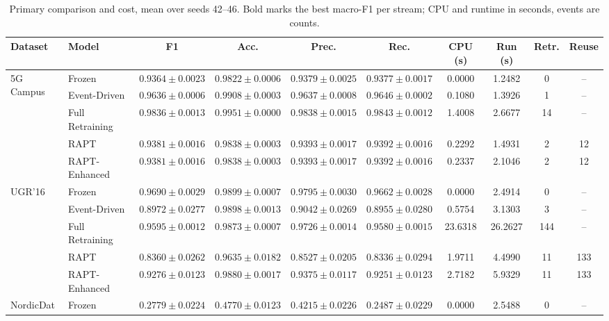 \documentclass[conference]{IEEEtran}
\begin{document}
\begin{table}[t]
\caption{Primary comparison and cost, mean over seeds 42--46. Bold marks the
best macro-F1 per stream; CPU and runtime in seconds, events are counts.}
\label{tab:primary}
\centering
\scriptsize
\begin{tabular}{@{}llcccccccc@{}}
\toprule
\textbf{Dataset} & \textbf{Model} & \textbf{F1} & \textbf{Acc.} & \textbf{Prec.} & \textbf{Rec.} & \textbf{CPU (s)} & \textbf{Run (s)} & \textbf{Retr.} & \textbf{Reuse} \\
\midrule
\multirow{5}{*}{5G Campus}
 & Frozen          & $0.9364 \pm 0.0023$ & $0.9822 \pm 0.0006$ & $0.9379 \pm 0.0025$ & $0.9377 \pm 0.0017$ & 0.0000 & 1.2482 & 0 & -- \\
 & Event-Driven    & $0.9636 \pm 0.0006$ & $0.9908 \pm 0.0003$ & $0.9637 \pm 0.0008$ & $0.9646 \pm 0.0002$ & 0.1080 & 1.3926 & 1 & -- \\
 & Full Retraining & $\mathbf{0.9836 \pm 0.0013}$ & $0.9951 \pm 0.0000$ & $0.9838 \pm 0.0015$ & $0.9843 \pm 0.0012$ & 1.4008 & 2.6677 & 14 & -- \\
 & RAPT            & $0.9381 \pm 0.0016$ & $0.9838 \pm 0.0003$ & $0.9393 \pm 0.0017$ & $0.9392 \pm 0.0016$ & 0.2292 & 1.4931 & 2 & 12 \\
 & RAPT-Enhanced   & $0.9381 \pm 0.0016$ & $0.9838 \pm 0.0003$ & $0.9393 \pm 0.0017$ & $0.9392 \pm 0.0016$ & 0.2337 & 2.1046 & 2 & 12 \\
\midrule
\multirow{5}{*}{UGR'16}
 & Frozen          & $\mathbf{0.9690 \pm 0.0029}$ & $0.9899 \pm 0.0007$ & $0.9795 \pm 0.0030$ & $0.9662 \pm 0.0028$ & 0.0000 & 2.4914 & 0 & -- \\
 & Event-Driven    & $0.8972 \pm 0.0277$ & $0.9898 \pm 0.0013$ & $0.9042 \pm 0.0269$ & $0.8955 \pm 0.0280$ & 0.5754 & 3.1303 & 3 & -- \\
 & Full Retraining & $0.9595 \pm 0.0012$ & $0.9873 \pm 0.0007$ & $0.9726 \pm 0.0014$ & $0.9580 \pm 0.0015$ & 23.6318 & 26.2627 & 144 & -- \\
 & RAPT            & $0.8360 \pm 0.0262$ & $0.9635 \pm 0.0182$ & $0.8527 \pm 0.0205$ & $0.8336 \pm 0.0294$ & 1.9711 & 4.4990 & 11 & 133 \\
 & RAPT-Enhanced   & $0.9276 \pm 0.0123$ & $0.9880 \pm 0.0017$ & $0.9375 \pm 0.0117$ & $0.9251 \pm 0.0123$ & 2.7182 & 5.9329 & 11 & 133 \\
\midrule
\multirow{5}{*}{NordicDat}
 & Frozen          & $0.2779 \pm 0.0224$ & $0.4770 \pm 0.0123$ & $0.4215 \pm 0.0226$ & $0.2487 \pm 0.0229$ & 0.0000 & 2.5488 & 0 & -- \\

\end{tabular}
\end{table}
\end{document}
